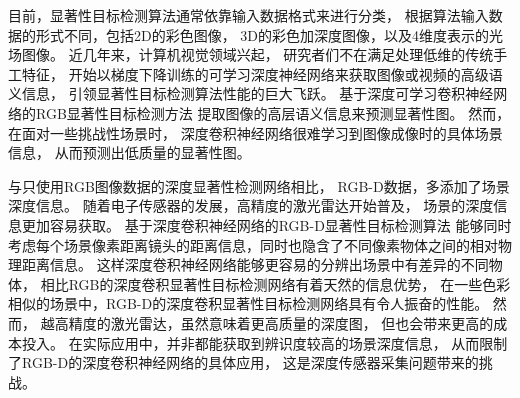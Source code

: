 



目前，显著性目标检测算法通常依靠输入数据格式来进行分类，
根据算法输入数据的形式不同，包括2D的彩色图像，
3D的彩色加深度图像，以及4维度表示的光场图像。
近几年来，计算机视觉领域兴起，
研究者们不在满足处理低维的传统手工特征，
开始以梯度下降训练的可学习深度神经网络来获取图像或视频的高级语义信息，
引领显著性目标检测算法性能的巨大飞跃。
基于深度可学习卷积神经网络的RGB显著性目标检测方法
提取图像的高层语义信息来预测显著性图。
然而，在面对一些挑战性场景时，
深度卷积神经网络很难学习到图像成像时的具体场景信息，
从而预测出低质量的显著性图。



与只使用RGB图像数据的深度显著性检测网络相比，
RGB-D数据，多添加了场景深度信息。
随着电子传感器的发展，高精度的激光雷达开始普及，
场景的深度信息更加容易获取。
基于深度卷积神经网络的RGB-D显著性目标检测算法
能够同时考虑每个场景像素距离镜头的距离信息，同时也隐含了不同像素物体之间的相对物理距离信息。
这样深度卷积神经网络能够更容易的分辨出场景中有差异的不同物体，
相比RGB的深度卷积显著性目标检测网络有着天然的信息优势，
在一些色彩相似的场景中，RGB-D的深度卷积显著性目标检测网络具有令人振奋的性能。
然而，
越高精度的激光雷达，虽然意味着更高质量的深度图，
但也会带来更高的成本投入。
在实际应用中，并非都能获取到辨识度较高的场景深度信息，
从而限制了RGB-D的深度卷积神经网络的具体应用，
这是深度传感器采集问题带来的挑战。





